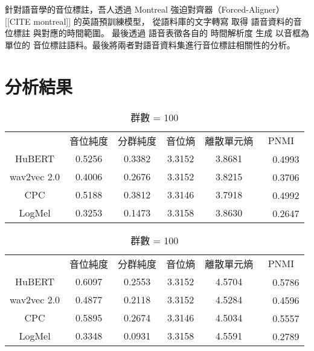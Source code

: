         針對語音學的音位標註，吾人透過 Montreal 強迫對齊器（Forced-Aligner） [[CITE montreal]] 的英語預訓練模型， 從語料庫的文字轉寫 取得 語音資料的音位標註 與對應的時間範圍。 最後透過 語音表徵各自的 時間解析度 生成 以音框為單位的 音位標註語料。最後將兩者對語音資料集進行音位標註相關性的分析。

\section{分析結果}




        \begin{table}[!htbp]
            \centering
            \begin{subtable}[t]{\textwidth}
                \centering
                \begin{tabular}{cccccc}
                                & 音位純度 & 分群純度 & 音位熵 & 離散單元熵 &    PNMI \\
                    HuBERT      &   0.5256 &   0.3382 & 3.3152 &     3.8681 &　0.4993 \\   %
                    wav2vec 2.0 &   0.4006 &   0.2676 & 3.3152 &     3.8215 &　0.3706 \\   %
                    CPC         &   0.5188 &   0.3812 & 3.3146 &     3.7918 &　0.4992 \\   %
                    LogMel      &   0.3253 &   0.1473 & 3.3158 &     3.8630 &　0.2647 \\   %
                \end{tabular}
                \caption{群數 = 50}
                \label{tab:ch3-clu050}
            \end{subtable}        

            \vspace{0.5cm}        

            \begin{subtable}[t]{\textwidth}
                \centering
                \begin{tabular}{cccccc}
                                & 音位純度 & 分群純度 & 音位熵 & 離散單元熵 &    PNMI \\
                    HuBERT      &   0.6097 &   0.2553 & 3.3152 &     4.5704 &　0.5786 \\   %
                    wav2vec 2.0 &   0.4877 &   0.2118 & 3.3152 &     4.5284 &　0.4596 \\   %
                    CPC         &   0.5895 &   0.2674 & 3.3146 &     4.5034 &　0.5557 \\   %
                    LogMel      &   0.3348 &   0.0931 & 3.3158 &     4.5591 &　0.2789 \\   %
                \end{tabular}
                \caption{群數 = 100}
                \label{tab:ch3-clu100}
            \end{subtable}        


\end{table}
